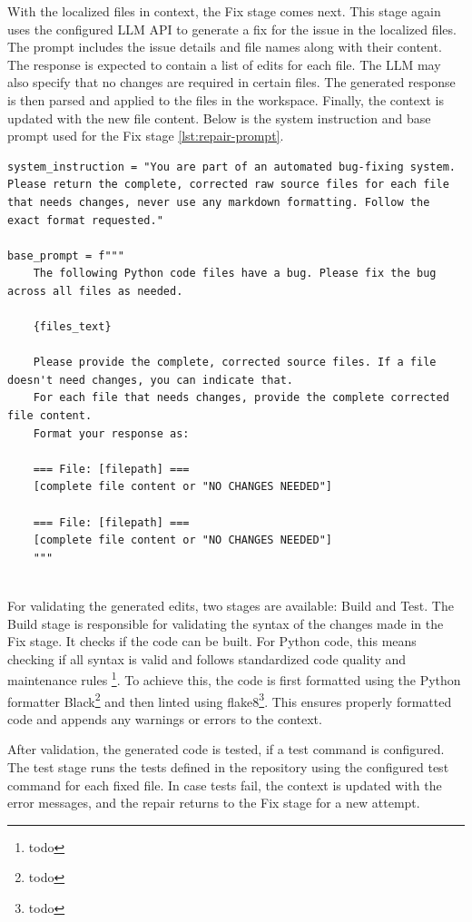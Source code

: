 With the localized files in context, the Fix stage comes next. This stage again uses the configured \ac{LLM} API to generate a fix for the issue in the localized files. The prompt includes the issue details and file names along with their content. The response is expected to contain a list of edits for each file. The \ac{LLM} may also specify that no changes are required in certain files. The generated response is then parsed and applied to the files in the workspace. Finally, the context is updated with the new file content. Below is the system instruction and base prompt used for the Fix stage \ref{lst:repair-prompt}.

\begin{lstlisting}[style=python, caption={Repair Prompt}, label={lst:repair-prompt}]
system_instruction = "You are part of an automated bug-fixing system. Please return the complete, corrected raw source files for each file that needs changes, never use any markdown formatting. Follow the exact format requested."

base_prompt = f"""
    The following Python code files have a bug. Please fix the bug across all files as needed.

    {files_text}

    Please provide the complete, corrected source files. If a file doesn't need changes, you can indicate that.
    For each file that needs changes, provide the complete corrected file content.
    Format your response as:

    === File: [filepath] ===
    [complete file content or "NO CHANGES NEEDED"]

    === File: [filepath] ===
    [complete file content or "NO CHANGES NEEDED"]
    """
    
\end{lstlisting}

For validating the generated edits, two stages are available: Build and Test. The Build stage is responsible for validating the syntax of the changes made in the Fix stage. It checks if the code can be built. For Python code, this means checking if all syntax is valid and follows standardized code quality and maintenance rules \footnote{todo}. To achieve this, the code is first formatted using the Python formatter Black\footnote{todo} and then linted using flake8\footnote{todo}. This ensures properly formatted code and appends any warnings or errors to the context.

After validation, the generated code is tested, if a test command is configured. The test stage runs the tests defined in the repository using the configured test command for each fixed file. In case tests fail, the context is updated with the error messages, and the repair returns to the Fix stage for a new attempt.

